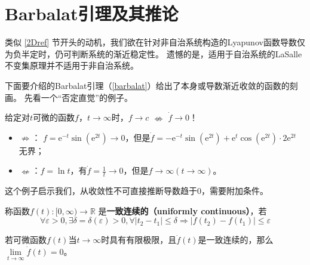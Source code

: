 \section{Barbalat引理及其推论}\label{3Eref}
类似 \ref{2Dref} 节开头的动机，我们欲在针对非自治系统构造的Lyapunov函数导数仅为负半定时，仍可判断系统的渐近稳定性。
遗憾的是，适用于自治系统的LaSalle不变集原理并不适用于非自治系统。

下面要介绍的Barbalat引理（\ref{barbalat}）给出了本身或导数渐近收敛的函数的刻画。
先看一个“否定直觉”的例子。
\begin{example}
    给定对$t$可微的函数$f$，$t \rightarrow \infty$时，$f\to c$  $\nLeftrightarrow $ $\dot{f} \rightarrow 0$！
  \begin{itemize}[leftmargin=1em]
    \item $\nRightarrow $： $f = \mathrm{e}^{- t} \sin (\mathrm{e}^{2 t}) \rightarrow 0$，但是$ \dot{f} = - \mathrm{e}^{- t} \sin
    (\mathrm{e}^{2 t}) + \mathrm{e}^t \cos (\mathrm{e}^{2 t}) \cdot 2 \mathrm{e}^{2 t}$ 无界；    
    \item $\nLeftarrow $：$f = \ln  t$，有$ \dot{f} = \frac{1}{t} \rightarrow0$，但是$f \rightarrow \infty(t \rightarrow \infty)$。
  \end{itemize}
\end{example}
这个例子启示我们，从收敛性不可直接推断导数趋于$0$，需要附加条件。
\begin{definition}
    称函数$f(t) : [0,\infty) \rightarrow \mathbb{R}$ 是{\bf 一致连续的（uniformly continuous）}，若
     \[\forall \varepsilon > 0, \exists \delta
  = \delta (\varepsilon) > 0, \forall | t_2 - t_1 | \leq \delta \Rightarrow |
  f (t_2) - f (t_1) | \leq \varepsilon\]
\end{definition}
\begin{theorem}[Barbalat引理]\label{barbalat}
    若可微函数$f(t)$当$t\to\infty$时具有有限极限，且$\dot{f}(t)$是一致连续的，那么$\lim\limits_{t\to\infty}\dot{f}(t)=0$。
\end{theorem}

